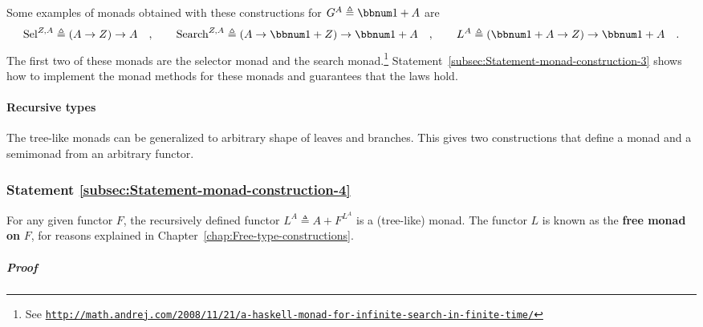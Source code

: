 Some examples of monads obtained with these constructions for $G^{A}\triangleq\bbnum 1+A$
are
\[
\text{Sel}^{Z,A}\triangleq\left(A\rightarrow Z\right)\rightarrow A\quad,\quad\quad\text{Search}^{Z,A}\triangleq\left(A\rightarrow\bbnum 1+Z\right)\rightarrow\bbnum 1+A\quad,\quad\quad L^{A}\triangleq\left(\bbnum 1+A\rightarrow Z\right)\rightarrow\bbnum 1+A\quad.
\]
The first two of these monads are the selector monad
and the search monad.\footnote{See \texttt{\href{http://math.andrej.com/2008/11/21/a-haskell-monad-for-infinite-search-in-finite-time/}{http://math.andrej.com/2008/11/21/a-haskell-monad-for-infinite-search-in-finite-time/}}}
Statement~\ref{subsec:Statement-monad-construction-3} shows how
to implement the monad methods for these monads and guarantees that
the laws hold.

\paragraph{Recursive types}

The tree-like monads can be generalized to arbitrary shape of leaves
and branches. This gives two constructions that define a monad and
a semimonad from an arbitrary functor.

\subsubsection{Statement \label{subsec:Statement-monad-construction-4}\ref{subsec:Statement-monad-construction-4}}

For any given functor $F$, the recursively defined functor $L^{A}\triangleq A+F^{L^{A}}$
is a (tree-like) monad. The functor $L$ is known as the \textbf{free
monad}\textbf{ on} $F$, for reasons explained
in Chapter~\ref{chap:Free-type-constructions}.

\subparagraph{Proof}

